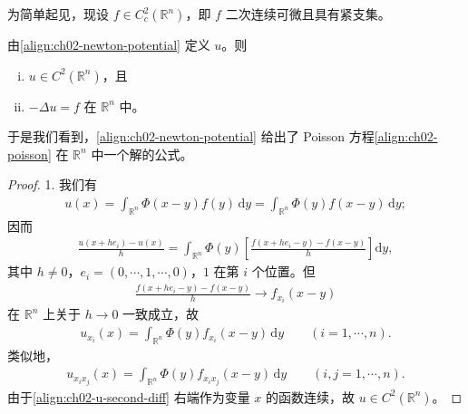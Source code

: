 \documentclass[../../main.tex]{subfiles}
\begin{document}
为简单起见，现设 $f\in C_c^2(\mathbb{R}^n)$，即 $f$ 二次连续可微且具有紧支集。

\begin{theorem}[求解 Poisson 方程]\label{theorem:ch02-solve-poisson}由\eqref{align:ch02-newton-potential} 定义 $u$。则
\begin{enumerate}[(i)]
\item $u\in C^2(\mathbb{R}^n)$，且
\item $-\Delta u=f$ 在 $\mathbb{R}^n$ 中。
\end{enumerate}
\end{theorem}

于是我们看到，\eqref{align:ch02-newton-potential} 给出了 Poisson 方程\eqref{align:ch02-poisson} 在 $\mathbb{R}^n$ 中一个解的公式。

\begin{proof}
1. 我们有
\begin{align}\label{align:ch02-u-change}
u(x)=\int_{\mathbb{R}^n}\Phi(x-y)f(y)\,\mathrm{d}y=\int_{\mathbb{R}^n}\Phi(y)f(x-y)\,\mathrm{d}y;
\end{align}
因而
\begin{align*}
\frac{u(x+he_i)-u(x)}{h}=\int_{\mathbb{R}^n}\Phi(y)\left[\frac{f(x+he_i-y)-f(x-y)}{h}\right]\mathrm{d}y,
\end{align*}
其中 $h\neq 0$，$e_i=(0,\cdots,1,\cdots,0)$，$1$ 在第 $i$ 个位置。但
\begin{align*}
\frac{f(x+he_i-y)-f(x-y)}{h}\to f_{x_i}(x-y)
\end{align*}
在 $\mathbb{R}^n$ 上关于 $h\to 0$ 一致成立，故
\begin{align*}
u_{x_i}(x)=\int_{\mathbb{R}^n}\Phi(y)f_{x_i}(x-y)\,\mathrm{d}y \qquad (i=1,\cdots,n).
\end{align*}
类似地，
\begin{align}\label{align:ch02-u-second-diff}
u_{x_i x_j}(x)=\int_{\mathbb{R}^n}\Phi(y)f_{x_i x_j}(x-y)\,\mathrm{d}y \qquad (i,j=1,\cdots,n).
\end{align}
由于\eqref{align:ch02-u-second-diff} 右端作为变量 $x$ 的函数连续，故 $u\in C^2(\mathbb{R}^n)$。


\end{proof}
\end{document}
